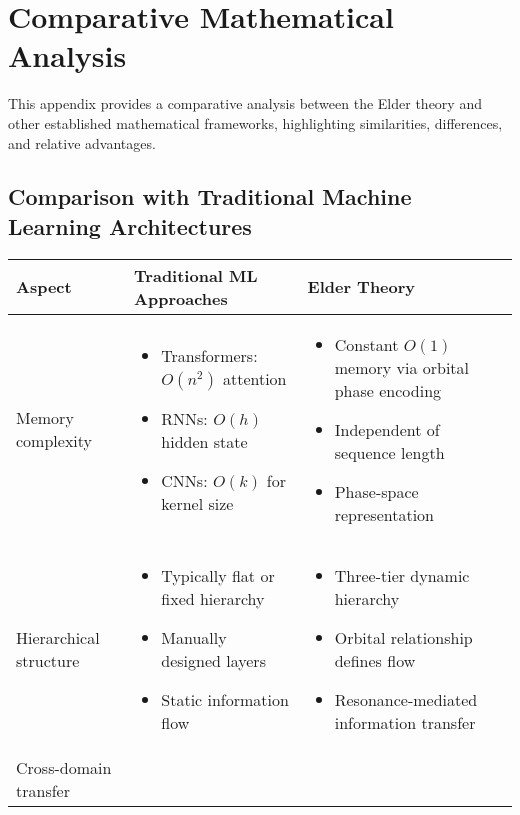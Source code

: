 \chapter{Comparative Mathematical Analysis}

This appendix provides a comparative analysis between the Elder theory and other established mathematical frameworks, highlighting similarities, differences, and relative advantages.

\section{Comparison with Traditional Machine Learning Architectures}

\begin{table}[h]
\centering
\begin{tabular}{|p{3cm}|p{5cm}|p{5cm}|}
\hline
\textbf{Aspect} & \textbf{Traditional ML Approaches} & \textbf{Elder Theory} \\
\hline
Memory complexity & 
\begin{itemize}
    \item Transformers: $O(n^2)$ attention
    \item RNNs: $O(h)$ hidden state
    \item CNNs: $O(k)$ for kernel size
\end{itemize} &
\begin{itemize}
    \item Constant $O(1)$ memory via orbital phase encoding
    \item Independent of sequence length
    \item Phase-space representation
\end{itemize} \\
\hline
Hierarchical structure & 
\begin{itemize}
    \item Typically flat or fixed hierarchy
    \item Manually designed layers
    \item Static information flow
\end{itemize} &
\begin{itemize}
    \item Three-tier dynamic hierarchy
    \item Orbital relationship defines flow
    \item Resonance-mediated information transfer
\end{itemize} \\
\hline
Cross-domain transfer & 

\end{tabular}
\end{table}
